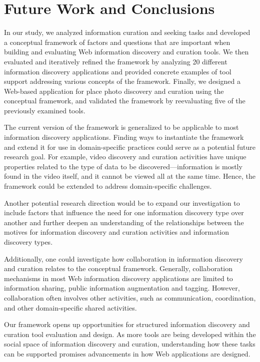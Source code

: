 \documentclass{sigchi}
\begin{document}
{\section{Future Work and Conclusions}
In our study, we analyzed information curation and seeking tasks and developed a conceptual framework of factors and questions that are important when building and evaluating Web information discovery and curation tools. We then evaluated and iteratively refined the framework by analyzing 20 different information discovery applications and provided concrete examples of tool support addressing various concepts of the framework. Finally, we designed a Web-based application for place photo discovery and curation using the conceptual framework, and validated the framework by reevaluating five of the previously examined tools.

The current version of the framework is generalized to be applicable to most information discovery applications. Finding ways to instantiate the framework and extend it for use in domain-specific practices could serve as a potential future research goal. For example, video discovery and curation activities have unique properties related to the type of data to be discovered---information is mostly found in the video itself, and it cannot be viewed all at the same time. Hence, the framework could be extended to address domain-specific challenges. 

Another potential research direction would be to expand our investigation to include factors that influence the need for one information discovery type over another and further deepen an understanding of the relationships between the motives for information discovery and curation activities and information discovery types. 

Additionally, one could investigate how collaboration in information discovery and curation relates to the conceptual framework. Generally, collaboration mechanisms in most Web information discovery applications are limited to information sharing, public information augmentation and tagging. However, collaboration often involves other activities, such as communication, coordination, and other domain-specific shared activities.

Our framework opens up opportunities for structured information discovery and curation tool evaluation and design. As more tools are being developed within the social space of information discovery and curation, understanding how these tasks can be supported promises advancements in how Web applications are designed.

}
\end{document}
